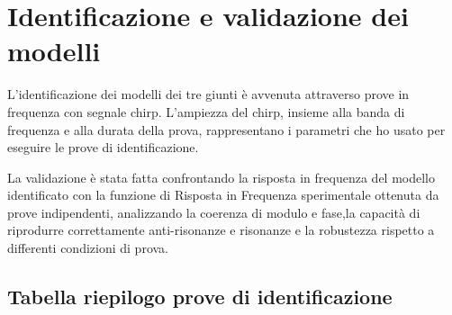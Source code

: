 \documentclass{article}
\begin{document}
\section{Identificazione e validazione dei modelli}
\label{sec:ident_valid}

L'identificazione dei modelli dei tre giunti è avvenuta attraverso prove in frequenza con segnale chirp. 
L'ampiezza del chirp, insieme alla banda di frequenza e alla durata della prova, rappresentano i 
parametri che ho usato per eseguire le prove di identificazione.

La validazione è stata fatta confrontando la risposta in frequenza del modello 
identificato con la funzione di Risposta in Frequenza sperimentale ottenuta da prove indipendenti, analizzando la
coerenza di modulo e fase,la capacità di riprodurre correttamente anti-risonanze e 
risonanze e la robustezza rispetto a differenti condizioni di prova.

\subsection*{Tabella riepilogo prove di identificazione}
\begin{table}[H]
    \centering
    \footnotesize
    \caption{Riepilogo test di identificazione e parametri di stima.}
    \label{tab:ident_tests}
\end{table}
\end{document}
